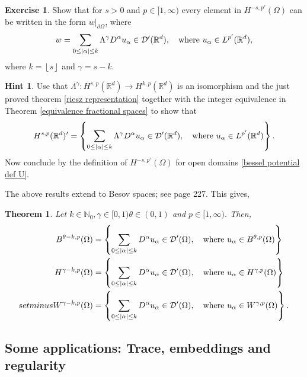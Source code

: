 \documentclass[
    a4paper,
    DIV=14,
    abstract=true,
    numbers=noenddot
]
{scrartcl}
\newtheorem{theorem}{Theorem}[section]
\theoremstyle{definition}
\newtheorem{exercise}{Exercise}
\newtheorem*{hint}{Hint}
\newcommand{\set}[1]{\left\{#1\right\}}
\newcommand\restr[2]{\left.#1\right|_{#2}}
\newcommand{\N}{\mathbb{N}}
\newcommand{\R}{\mathbb{R}}
\newcommand{\Dd}{\mathcal{D}}
\begin{document}
\begin{exercise}
  Show that for $s>0$ and $p \in [1,\infty)$ every element in $H^{-s,p'}(\Omega )$ can be written in the form $\restr{w}{\partial \Omega }$, where
  \begin{align*}
    w=\sum_{0\leq\abs{\alpha}\leq k} \Lambda^{\gamma } D^\alpha u_\alpha\in \Dd'(\R^d ),\quad \text{where }    u_\alpha \in L^{p'}(\R^d ),
  \end{align*}
  where $k =\left\lfloor s \right\rfloor$ and $\gamma =s-k$.
\end{exercise}
\begin{hint}
  Use that $\Lambda ^{\gamma }: H^{s,p}(\R^d) \to H^{k ,p}(\R^d)$ is an isomorphism and the just proved theorem \ref{riesz representation} together with the integer equivalence in Theorem \ref{equivalence fractional spaces} to show that
  \begin{align*}
    H^{s,p}(\R^d)' = \set{ \sum_{0\leq\abs{\alpha}\leq k} \Lambda^{\gamma } D^\alpha u_\alpha\in \Dd'(\R^d ),\quad \text{where }    u_\alpha \in L^{p'}(\R^d )}.
  \end{align*}
  Now conclude by the definition of $H^{-s,p'}(\Omega )$ for open domains \ref{bessel potential def U}.
\end{hint}
The above results extend to Besov spaces; see \cite{agranovich2015sobolev} page 227. This gives,
\begin{theorem}
  Let  $k \in \N_0, \gamma \in [0,1) \theta \in (0,1)$ and $p \in [1,\infty)$. Then,
  \begin{align*}
    B^{\theta  -k,p}(\Omega ) & = \set{ \sum_{0\leq\abs{\alpha}\leq k} D^\alpha u_\alpha\in \Dd'(\Omega ),\quad \text{where }    u_\alpha \in B^{\theta  ,p}(\Omega )} \\
    H^{\gamma -k,p}(\Omega )  & = \set{ \sum_{0\leq\abs{\alpha}\leq k} D^\alpha u_\alpha\in \Dd'(\Omega ),\quad \text{where }    u_\alpha \in H^{\gamma ,p}(\Omega )}  \\setminus	W^{\gamma -k,p}(\Omega )  & = \set{ \sum_{0\leq\abs{\alpha}\leq k} D^\alpha u_\alpha\in \Dd'(\Omega ),\quad \text{where }    u_\alpha \in W^{\gamma ,p}(\Omega )}.
  \end{align*}
\end{theorem}








\subsection{Some applications: Trace, embeddings and regularity}
\end{document}
